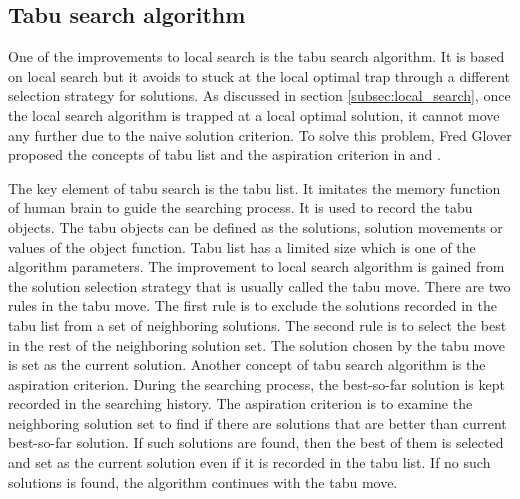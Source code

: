 		\subsection{Tabu search algorithm}
		\label{subsec:tabu_search}
		One of the improvements to local search is the tabu search algorithm. It is based on local search but it avoids to stuck at the
		local optimal trap through a different selection strategy for solutions. As discussed in section \ref{subsec:local_search}, once
		the local search algorithm is trapped at a local optimal solution, it cannot move any further due to the naive solution criterion.
		To solve this problem, Fred Glover proposed the concepts of tabu list and the aspiration criterion in \cite{doi:10.1287/ijoc.1.3.190} and \cite{doi:10.1287/ijoc.2.1.4}.
		
		The key element of tabu search is the tabu list. It imitates the memory function of human brain to guide the searching process.
		It is used to record the tabu objects. The tabu objects can be defined as the solutions, solution movements or values of the 
		object function. Tabu list has a limited size which is one of the algorithm parameters. The improvement to local search algorithm
		is gained from the solution selection strategy that is usually called the tabu move. There are two rules in the tabu move. The
		first rule is to exclude the solutions recorded in the tabu list from a set of neighboring solutions. The second rule is to
		select the best in the rest of the neighboring solution set. The solution chosen by the tabu move is set as the current solution.
		Another concept of tabu search algorithm is the aspiration criterion. During the searching process, the best-so-far solution is
		kept recorded in the searching history. The aspiration criterion is to examine the neighboring solution set to find if there are solutions that are better than current best-so-far solution. If such solutions are found, then the best of them is selected and
		set as the current solution even if it is recorded in the tabu list. If no such solutions is found, the algorithm continues with
		the tabu move.
		
				
		
